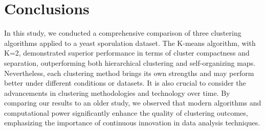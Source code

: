 \documentclass{llncs}
\begin{document}
 \section{Conclusions}
 
In this study, we conducted a comprehensive comparison of three clustering algorithms applied to a yeast sporulation dataset. The K-means algorithm, with K=2, demonstrated superior performance in terms of cluster compactness and separation, outperforming both hierarchical clustering and self-organizing maps. Nevertheless, each clustering method brings its own strengths and may perform better under different conditions or datasets. It is also crucial to consider the advancements in clustering methodologies and technology over time. By comparing our results to an older study, we observed that modern algorithms and computational power significantly enhance the quality of clustering outcomes, emphasizing the importance of continuous innovation in data analysis techniques.

\end{document}
